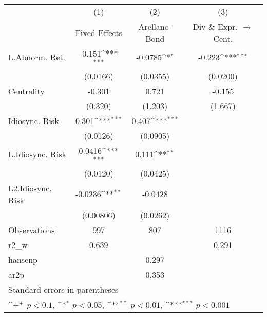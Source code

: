 {
\def\sym#1{\ifmmode^{#1}\else\(^{#1}\)\fi}
\begin{tabular}{l*{3}{c}}
\hline\hline
                    &\multicolumn{1}{c}{(1)}&\multicolumn{1}{c}{(2)}&\multicolumn{1}{c}{(3)}\\
                    &\multicolumn{1}{c}{Fixed Effects}&\multicolumn{1}{c}{Arellano-Bond}&\multicolumn{1}{c}{Div \& Expr. $\rightarrow$ Cent.}\\
\hline
L.Abnorm. Ret.      &      -0.151\sym{***}&     -0.0785\sym{*}  &      -0.223\sym{***}\\
                    &    (0.0166)         &    (0.0355)         &    (0.0200)         \\
Centrality          &      -0.301         &       0.721         &      -0.155         \\
                    &     (0.320)         &     (1.203)         &     (1.667)         \\
Idiosync. Risk      &       0.301\sym{***}&       0.407\sym{***}&                     \\
                    &    (0.0126)         &    (0.0905)         &                     \\
L.Idiosync. Risk    &      0.0416\sym{***}&       0.111\sym{**} &                     \\
                    &    (0.0120)         &    (0.0425)         &                     \\
L2.Idiosync. Risk   &     -0.0236\sym{**} &     -0.0428         &                     \\
                    &   (0.00806)         &    (0.0262)         &                     \\
\hline
Observations        &         997         &         807         &        1116         \\
r2\_w                &       0.639         &                     &       0.291         \\
hansenp             &                     &       0.297         &                     \\
ar2p                &                     &       0.353         &                     \\
\hline\hline
\multicolumn{4}{l}{\footnotesize Standard errors in parentheses}\\
\multicolumn{4}{l}{\footnotesize \sym{+} \(p<0.1\), \sym{*} \(p<0.05\), \sym{**} \(p<0.01\), \sym{***} \(p<0.001\)}\\
\end{tabular}
}
